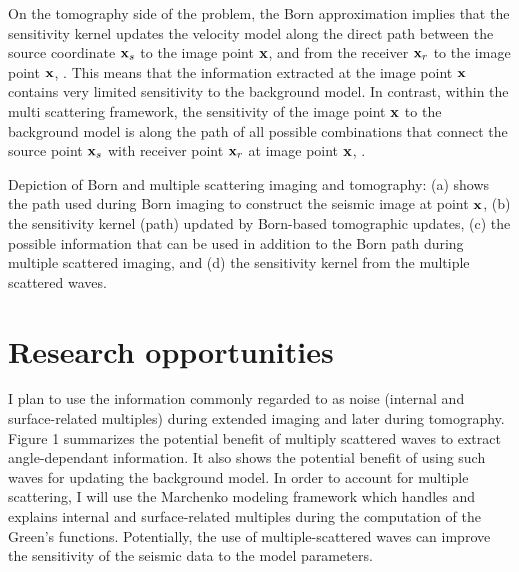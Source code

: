On the tomography side of the problem, the Born approximation implies that the sensitivity 
kernel updates the velocity model along the direct path between the source coordinate ${\bf x}_s$ to 
the image point ${\bf x}$, and from the receiver  ${\bf x}_r$ to the image point ${\bf x}$, . This means
that the information extracted at the image point ${\bf x}$ contains very limited sensitivity to
the background model. In contrast, within the multi scattering framework, the sensitivity of the 
image point ${\bf x}$ to the background model is along the path of all possible combinations that connect
the source point ${\bf x}_s$ with receiver point ${\bf x}_r$ at image point ${\bf x}$, .


%
{Depiction of Born and multiple scattering imaging and tomography: (a) shows the path used during Born imaging to construct
the seismic image at point ${\bf x}$, (b) the sensitivity kernel (path) updated by Born-based tomographic updates,
(c) the possible information that can be used in addition to the Born path during  multiple scattered imaging, and (d) 
the sensitivity kernel from the multiple scattered waves.}



\section{Research opportunities}

I plan to use the information commonly regarded to as noise (internal and surface-related multiples) during 
extended imaging and later during tomography. Figure 1 summarizes the potential benefit of multiply scattered 
waves to extract angle-dependant information. It also shows the potential benefit of using such waves
for updating the background model. In order to account for multiple scattering, I will use 
the Marchenko modeling framework \citep{Fil2012,Behura,Fil2014,Wapenaar,Singh2015} which handles and explains 
internal and surface-related multiples \citep{Singh2015} during the computation of the Green's functions. 
Potentially, the use of multiple-scattered waves can improve the sensitivity of the seismic data
to the model parameters. 

